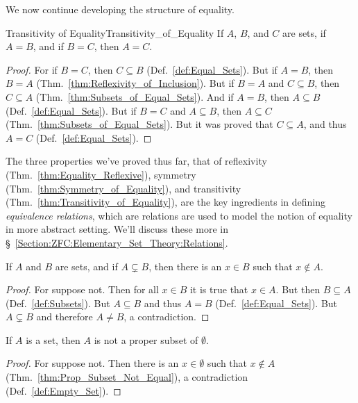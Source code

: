         We now continue developing the structure of equality.
        \begin{ltheorem}{Transitivity of Equality}{Transitivity_of_Equality}
            If $A$, $B$, and $C$ are sets, if $A=B$, and if $B=C$, then $A=C$.
        \end{ltheorem}
        \begin{proof}
            For if $B=C$, then $C\subseteq{B}$ (Def.~\ref{def:Equal_Sets}). But
            if $A=B$, then $B=A$ (Thm.~\ref{thm:Reflexivity_of_Inclusion}). But
            if $B=A$ and $C\subseteq{B}$, then $C\subseteq{A}$
            (Thm.~\ref{thm:Subsets_of_Equal_Sets}). And if $A=B$, then
            $A\subseteq{B}$ (Def.~\ref{def:Equal_Sets}). But if $B=C$ and
            $A\subseteq{B}$, then $A\subseteq{C}$
            (Thm.~\ref{thm:Subsets_of_Equal_Sets}). But it was proved that
            $C\subseteq{A}$, and thus $A=C$ (Def.~\ref{def:Equal_Sets}).
        \end{proof}
        The three properties we've proved thus far, that of reflexivity
        (Thm.~\ref{thm:Equality_Reflexive}), symmetry
        (Thm.~\ref{thm:Symmetry_of_Equality}), and transitivity
        (Thm.~\ref{thm:Transitivity_of_Equality}), are the key ingredients in
        defining \textit{equivalence relations},
        which are relations are used to model the notion of equality in more
        abstract setting. We'll discuss these more in
        \S~\ref{Section:ZFC:Elementary_Set_Theory:Relations}.
        \begin{theorem}
            \label{thm:Prop_Subset_Not_Equal}%
            If $A$ and $B$ are sets, and if $A\subsetneq{B}$, then there is an
            $x\in{B}$ such that $x\notin{A}$.
        \end{theorem}
        \begin{proof}
            For suppose not. Then for all $x\in{B}$ it is true that $x\in{A}$.
            But then $B\subseteq{A}$ (Def.~\ref{def:Subsets}).
            But $A\subseteq{B}$ and thus $A=B$ (Def.~\ref{def:Equal_Sets}).
            But $A\subsetneq{B}$ and therefore $A\ne{B}$, a contradiction.
        \end{proof}
        \begin{theorem}
            If $A$ is a set, then $A$ is not a proper subset of $\emptyset$.
        \end{theorem}
        \begin{proof}
            For suppose not. Then there is an $x\in\emptyset$ such that
            $x\notin{A}$ (Thm.~\ref{thm:Prop_Subset_Not_Equal}), a
            contradiction (Def.~\ref{def:Empty_Set}).
        \end{proof}
